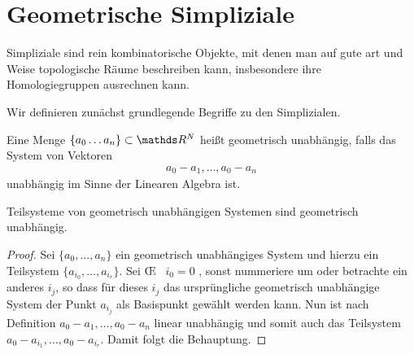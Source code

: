 





\section{Geometrische Simpliziale}

Simpliziale sind rein kombinatorische Objekte, mit denen man auf gute
art und Weise topologische Räume beschreiben kann, insbesondere ihre
Homologiegruppen ausrechnen kann.

Wir definieren zunächst grundlegende Begriffe zu den Simplizialen.

\begin{Def}
  Eine Menge $\{ a_0\ldots a_n \} \subset \R^N$ heißt geometrisch
  unabhängig, falls das System von Vektoren
  \begin{gather*}
    a_0 - a_1 , \ldots , a_0 - a_n
  \end{gather*}
  unabhängig im Sinne der Linearen Algebra ist.
\end{Def}

\begin{Lem}
  Teilsysteme von geometrisch unabhängigen Systemen sind geometrisch
  unabhängig.
  \begin{proof}
    Sei $\{ a_0 , \ldots , a_n \}$ ein geometrisch unabhängiges System und hierzu 
    ein Teilsystem $\{ a_{i_0},\ldots,a_{i_r} \}$. 
    Sei \OE~ $i_0 = 0$ , sonst nummeriere um oder betrachte ein anderes $i_j$, so dass für dieses $i_j$ das ursprüngliche geometrisch unabhängige System der Punkt $a_{i_j}$ als Basispunkt gewählt werden kann. Nun ist nach Definition $ a_0 - a_1 , \ldots , a_0 - a_n$ linear unabhängig und somit auch das Teilsystem $ a_0 - a_ {i_1}, \ldots , a_0 - a_{i_r}$.
    Damit folgt die Behauptung.
  \end{proof}
\end{Lem}


